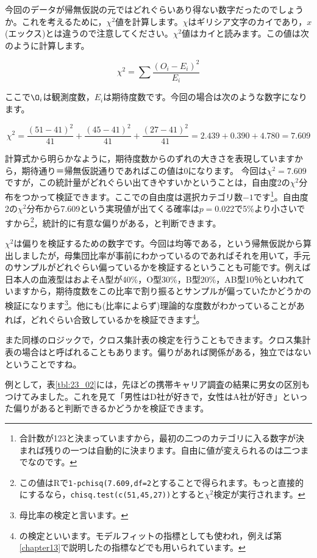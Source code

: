 \documentclass{ltjsbook}
\begin{document}
今回のデータが帰無仮説の元ではどれぐらいあり得ない数字だったのでしょうか。これを考えるために，$\chi^2$値を計算します。$\chi$はギリシア文字のカイであり，$x$(エックス)とは違うので注意してください。$\chi^2$値はカイと読みます。この値は次のように計算します。

\[ \chi^2 = \sum \frac{(O_i - E_i)^2}{E_i} \]

ここで$\O_i$は観測度数，$E_i$は期待度数です。今回の場合は次のような数字になります。

\[ \chi^2 = \frac{(51-41)^2}{41} + \frac{(45-41)^2}{41} + \frac{(27-41)^2}{41} = 2.439+0.390+4.780=7.609 \]

計算式から明らかなように，期待度数からのずれの大きさを表現していますから，期待通り＝帰無仮説通りであればこの値は0になります。
今回は$\chi^2=7.609$ですが，この統計量がどれぐらい出てきやすいかということは，自由度2の$\chi^2$分布をつかって検証できます。ここでの自由度は選択カテゴリ数$-1$です\footnote{合計数が123と決まっていますから，最初の二つのカテゴリに入る数字が決まれば残りの一つは自動的に決まります。自由に値が変えられるのは二つまでなのです。}。自由度2の$\chi^2$分布から7.609という実現値が出てくる確率は$p=0.022$で5\%より小さいですから\footnote{この値はRで\verb|1-pchisq(7.609,df=2|とすることで得られます。もっと直接的にするなら，\verb|chisq.test(c(51,45,27))|とすると$\chi^2$検定が実行されます。}，統計的に有意な偏りがある，と判断できます。

$\chi^2$は偏りを検証するための数字です。今回は均等である，という帰無仮説から算出しましたが，母集団比率が事前にわかっているのであればそれを用いて，手元のサンプルがどれぐらい偏っているかを検証するということも可能です。例えば日本人の血液型はおよそA型が40\%，O型30\%，B型20\%，AB型10％といわれていますから，期待度数をこの比率で割り振るとサンプルが偏っていたかどうかの検証になります\footnote{母比率の検定と言います。}。他にも(比率によらず)理論的な度数がわかっていることがあれば，どれぐらい合致しているかを検証できます\footnote{の検定といいます。モデルフィットの指標としても使われ，例えば第\ref{chapter13}で説明したの指標などでも用いられています。}。

また同様のロジックで，クロス集計表の検定を行うこともできます。クロス集計表の場合はと呼ばれることもあります。偏りがあれば関係がある，独立ではないということですね。

例として，表\ref{tbl:23_02}には，先ほどの携帯キャリア調査の結果に男女の区別もつけてみました。これを見て「男性はD社が好きで，女性はA社が好き」といった偏りがあると判断できるかどうかを検証できます。
\end{document}

